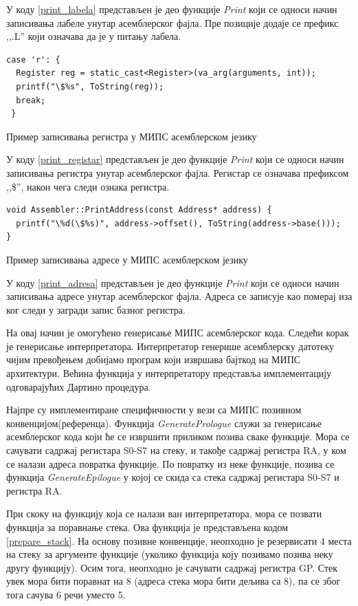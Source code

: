 \documentclass[12pt,oneside]{memoir}
\begin{document}
У коду \ref{print_labela} представљен је део функције \textit{Print} који се односи начин записивања лабеле унутар асемблерског фајла. Пре позиције додаје се префикс ,,.L'' који означава да је у питању лабела.

\begin{listing}
\begin{verbatim}
case 'r': {
  Register reg = static_cast<Register>(va_arg(arguments, int));
  printf("\$%s", ToString(reg));
  break;
 }
\end{verbatim}
\caption{Пример записивања регистра у МИПС асемблерском језику}
\label{print_registar}
\end{listing}
У коду \ref{print_registar} представљен је део функције \textit{Print} који се односи начин записивања регистра унутар асемблерског фајла. Регистар се означава префиксом ,,\$'', након чега следи ознака регистра.

\begin{listing}
\begin{verbatim}
void Assembler::PrintAddress(const Address* address) {
  printf("\%d(\$%s)", address->offset(), ToString(address->base()));
}
\end{verbatim}
\caption{Пример записивања адресе у МИПС асемблерском језику}
\label{print_adresa}
\end{listing}
У коду \ref{print_adresa} представљен је део функције \textit{Print} који се односи начин записивања адресе унутар асемблерског фајла. Адреса се записује као померај иза ког следи у загради запис базног регистра.


На овај начин је омогућено генерисање МИПС асемблерског кода. Следећи корак је генерисање интерпретатора. Интерпретатор генерише асемблерску датотеку чијим превођењем добијамо програм који извршава бајткод на МИПС архитектури. Већина функција у интерпретатору представља имплементацију одговарајућих Дартино процедура.

Најпре су имплементиране специфичности у вези са МИПС позивном конвенцијом(референца). Функција \textit{GeneratePrologue} служи за генерисање асемблерског кода који ће се извршити приликом позива сваке  функције. Мора се сачувати садржај регистара S0-S7 на стеку, и такође садржај регистра RA, у ком се налази адреса повратка функције. По повратку из неке функције, позива се функција \textit{GenerateEpilogue} у којој се скида са стека садржај регистара S0-S7 и регистра RA.

При скоку на функцију која се налази ван интерпретатора, мора се позвати функција за поравнање стека. Ова функција је представљена кодом \ref{prepare_stack}.
На основу позивне конвенције, неопходно је резервисати 4 места на стеку за аргументе функције (уколико функција коју позивамо позива неку другу функцију). Осим тога, неопходно је сачувати садржај регистра GP. Стек увек мора бити поравнат на 8 (адреса стека мора бити дељива са 8), па се због тога сачува 6 речи уместо 5.\\
\end{document}

